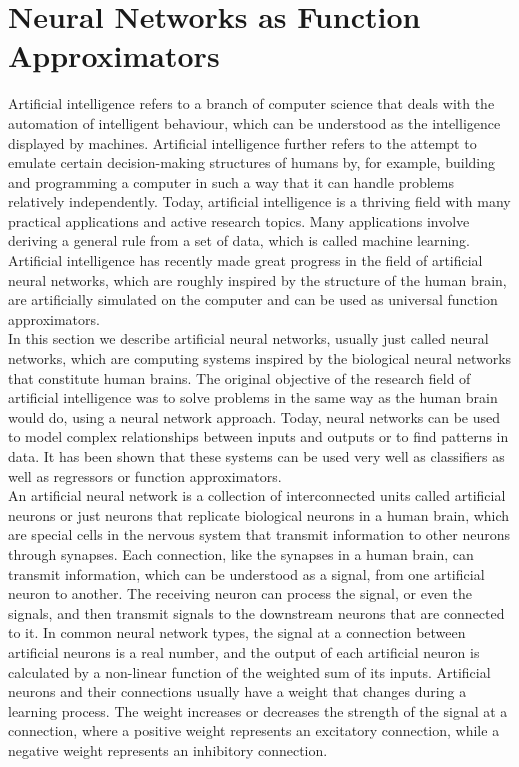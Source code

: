\section{Neural Networks as Function Approximators}
\label{ch1:sec3}

Artificial intelligence refers to a branch of computer science that deals with the automation of intelligent behaviour, which can be understood as the intelligence displayed by machines. Artificial intelligence further refers to the attempt to emulate certain decision-making structures of humans by, for example, building and programming a computer in such a way that it can handle problems relatively independently. Today, artificial intelligence is a thriving field with many practical applications and active research topics. Many applications involve deriving a general rule from a set of data, which is called machine learning. Artificial intelligence has recently made great progress in the field of artificial neural networks, which are roughly inspired by the structure of the human brain, are artificially simulated on the computer and can be used as universal function approximators. \\
In this section we describe artificial neural networks, usually just called neural networks, which are computing systems inspired by the biological neural networks that constitute human brains. The original objective of the research field of artificial intelligence was to solve problems in the same way as the human brain would do, using a neural network approach. Today, neural networks can be used to model complex relationships between inputs and outputs or to find patterns in data. It has been shown that these systems can be used very well as classifiers as well as regressors or function approximators. \\
An artificial neural network is a collection of interconnected units called artificial neurons or just neurons that replicate biological neurons in a human brain, which are special cells in the nervous system that transmit information to other neurons through synapses. Each connection, like the synapses in a human brain, can transmit information, which can be understood as a signal, from one artificial neuron to another. The receiving neuron can process the signal, or even the signals, and then transmit signals to the downstream neurons that are connected to it. In common neural network types, the signal at a connection between artificial neurons is a real number, and the output of each artificial neuron is calculated by a non-linear function of the weighted sum of its inputs. Artificial neurons and their connections usually have a weight that changes during a learning process. The weight increases or decreases the strength of the signal at a connection, where a positive weight represents an excitatory connection, while a negative weight represents an inhibitory connection. \\

